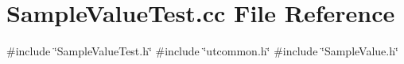 \section{Sample\+Value\+Test.\+cc File Reference}
\label{SampleValueTest_8cc}
{\ttfamily \#include \char`\"{}Sample\+Value\+Test.\+h\char`\"{}}\newline
{\ttfamily \#include \char`\"{}utcommon.\+h\char`\"{}}\newline
{\ttfamily \#include \char`\"{}Sample\+Value.\+h\char`\"{}}\newline
